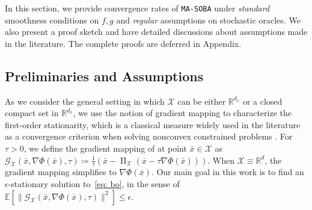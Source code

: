 \documentclass[10pt]{article}
\newtheorem{definition}{Definition}
\theoremstyle{remark}
\newcommand{\cG}{\mathcal{G}}
\newcommand{\cX}{\mathcal{X}}
\newcommand{\realset}{\mathbb{R}}
\newcommand{\E}{\mathbb{E}}
\newcommand{\norm}[1]{\left\|#1\right\|}
\DeclareMathOperator{\proj}{\Pi}
\begin{document}
In this section, we provide convergence rates of \texttt{MA-SOBA} under \emph{standard} smoothness conditions on $f, g$ and \emph{regular} assumptions on stochastic oracles. We also present a proof sketch and have detailed discussions about assumptions made in the literature. The complete proofs are deferred in Appendix.

\subsection{Preliminaries and Assumptions}

As we consider the general setting in which $\cX$ can be either $\realset^{d_x}$ or a closed compact set in $\realset^{d_x}$, we use the notion of gradient mapping to characterize the first-order stationarity, which is a classical measure widely used in the literature as a convergence criterion when solving nonconvex constrained problems \cite{nesterov2018lectures}. For $\tau>0$, we define the gradient mapping of at point $\bar x \in \cX$ as $\cG_{\cX}(\bar{x}, \nabla \Phi(\bar{x}), \tau) \coloneqq \frac{1}{\tau} (\bar{x} - \proj_\cX (\bar x - \tau \nabla \Phi(\bar{x})))$. When $\cX \equiv \realset^d$, the gradient mapping simplifies to $\nabla \Phi(\bar{x})$. Our main goal in this work is to find an $\epsilon$-stationary solution to~\eqref{eq: bo}, in the sense of  $\E[\| \mathcal{G}_{\cX}(\bar{x}, \nabla \Phi(\bar{x}), \tau)\|^2]\leq \epsilon$.
\end{document}
